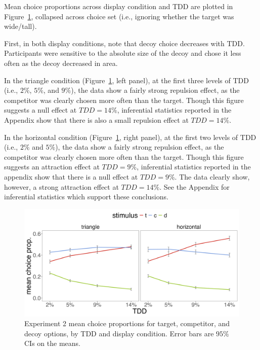 Mean choice proportions across display condition and TDD are plotted in Figure~\ref{fig:e2_choiceprops}, collapsed across choice set (i.e., ignoring whether the target was wide/tall). 

First, in both display conditions, note that decoy choice decreases with TDD. Participants were sensitive to the absolute size of the decoy and chose it less often as the decoy decreased in area. 

In the triangle condition (Figure~\ref{fig:e2_choiceprops}, left panel), at the first three levels of TDD (i.e., $2\%$, $5\%$, and $9\%$), the data show a fairly strong repulsion effect, as the competitor was clearly chosen more often than the target. Though this figure suggests a null effect at $TDD=14\%$, inferential statistics reported in the Appendix show that there is also a small repulsion effect at $TDD=14\%$.

In the horizontal condition (Figure~\ref{fig:e2_choiceprops}, right panel), at the first two levels of TDD (i.e., $2\%$ and $5\%$), the data show a fairly strong repulsion effect, as the competitor was clearly chosen more often than the target. Though this figure suggests an attraction effect at $TDD=9\%$, inferential statistics reported in the appendix show that there is a null effect at $TDD=9\%$. The data clearly show, however, a strong attraction effect at $TDD=14\%$. See the Appendix for inferential statistics which support these conclusions.

\begin{figure}
   \centering
   \includegraphics[width=\textwidth]{figures/choicePhase_att_trials_mean_choice_props_collapsed.jpg}
   \caption{Experiment 2 mean choice proportions for target, competitor, and decoy options, by TDD and display condition. Error bars are $95\%$ CIs on the means.}
   \label{fig:e2_choiceprops}
\end{figure}

